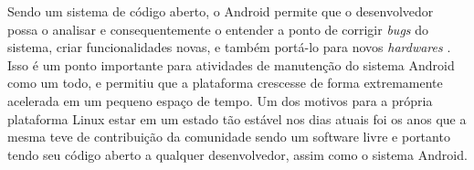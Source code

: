 Sendo um sistema de código aberto, o Android permite que o desenvolvedor possa o analisar e consequentemente o entender a ponto de corrigir \textit{bugs} do sistema, criar funcionalidades novas, e também portá-lo para novos \textit{hardwares} \cite{googleandroid}. Isso é um ponto importante para atividades de manutenção do sistema Android como um todo, e permitiu que a plataforma crescesse de forma extremamente acelerada em um pequeno espaço de tempo. Um dos motivos para a própria plataforma Linux estar em um estado tão estável nos dias atuais foi os anos que a mesma teve de contribuição da comunidade sendo um software livre e portanto tendo seu código aberto a qualquer desenvolvedor, assim como o sistema Android.